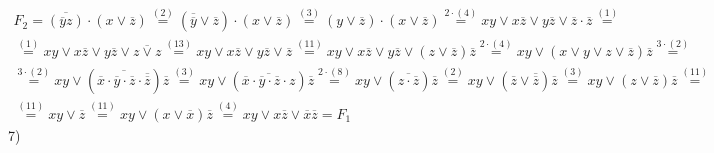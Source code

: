 \documentclass[11pt]{article}
\begin{document}
\begin{multline}
F_2 = \overline{(\overline{y}z)}\cdot(x \vee\overline{z}) \stackrel{(2)}{=}
(\overline{\overline{y}}\vee\overline{z})\cdot(x\vee\overline{z}) \stackrel{(3)}{=}
(y\vee\overline{z})\cdot(x\vee\overline{z}) \stackrel{2\cdot(4)}{=} xy \vee x\overline{z} \vee
y\overline{z}\vee\overline{z}\cdot\overline{z} \stackrel{(1)}{=} \\
\stackrel{(1)}{=} xy \vee x\overline{z} \vee y\overline{z}\vee\overline{z \vee z} \stackrel{(13)}{=}
xy\vee x\overline{z}\vee y\overline{z}\vee\overline{z} \stackrel{(11)}{=}
xy\vee x\overline{z}\vee y\overline{z}\vee(z\vee\overline{z})\overline{z} \stackrel{2\cdot(4)}{=}
xy\vee(x\vee y\vee z\vee\overline{z})\overline{z} \stackrel{3\cdot(2)}{=} \\
\stackrel{3\cdot(2)}{=} xy\vee(\overline{\overline{x}\cdot\overline{y}\cdot\overline{z}\cdot\overline{\overline{z}}})
\overline{z} \stackrel{(3)}{=} xy \vee (\overline{\overline{x}\cdot\overline{y}\cdot\overline{z}\cdot z})\overline{z}
\stackrel{2\cdot(8)}{=} xy \vee (\overline{z\cdot\overline{z}})\overline{z} \stackrel{(2)}{=}
xy \vee (\overline{z}\vee\overline{\overline{z}})\overline{z} \stackrel{(3)}{=}
xy \vee (z\vee\overline{z})\overline{z} \stackrel{(11)}{=} \\
\stackrel{(11)}{=} xy \vee \overline{z} \stackrel{(11)}{=} xy \vee (x\vee\overline{x})\overline{z}
\stackrel{(4)}{=} xy \vee x\overline{z}\vee\overline{x}\overline{z} = F_1
\end{multline}
7)
\end{document}
